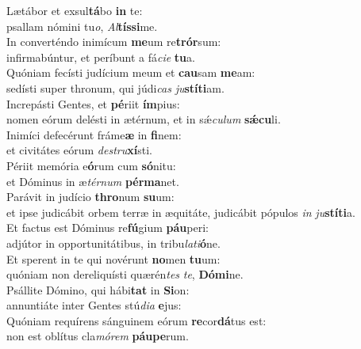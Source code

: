 \evenverse Lætábor et exsul\textbf{tá}bo \textbf{in} te:~\*\\
\evenverse psallam nómini tu\textit{o}, \textit{Al}\textbf{tís}\textbf{si}me.\\
\oddverse In converténdo inimícum \textbf{me}um re\textbf{trór}sum:~\*\\
\oddverse infirmabúntur, et períbunt a fá\textit{ci}\textit{e} \textbf{tu}a.\\
\evenverse Quóniam fecísti judícium meum et \textbf{cau}sam \textbf{me}am:~\*\\
\evenverse sedísti super thronum, qui júdi\textit{cas} \textit{ju}\textbf{stí}\textbf{ti}am.\\
\oddverse Increpásti Gentes, et \textbf{pé}riit \textbf{ím}pius:~\*\\
\oddverse nomen eórum delésti in ætérnum, et in sǽ\textit{cu}\textit{lum} \textbf{sǽ}\textbf{cu}li.\\
\evenverse Inimíci defecérunt fráme\textbf{æ} in \textbf{fi}nem:~\*\\
\evenverse et civitátes eórum \textit{de}\textit{stru}\textbf{xí}sti.\\
\oddverse Périit memória e\textbf{ó}rum cum \textbf{só}nitu:~\*\\
\oddverse et Dóminus in æ\textit{tér}\textit{num} \textbf{pér}\textbf{ma}net.\\
\evenverse Parávit in judício \textbf{thro}num \textbf{su}um:~\*\\
\evenverse et ipse judicábit orbem terræ in æquitáte, judicábit pópulos \textit{in} \textit{ju}\textbf{stí}\textbf{ti}a.\\
\oddverse Et factus est Dóminus re\textbf{fú}gium \textbf{páu}peri:~\*\\
\oddverse adjútor in opportunitátibus, in tribu\textit{la}\textit{ti}\textbf{ó}ne.\\
\evenverse Et sperent in te qui novérunt \textbf{no}men \textbf{tu}um:~\*\\
\evenverse quóniam non dereliquísti quærén\textit{tes} \textit{te}, \textbf{Dó}\textbf{mi}ne.\\
\oddverse Psállite Dómino, qui hábi\textbf{tat} in \textbf{Si}on:~\*\\
\oddverse annuntiáte inter Gentes stú\textit{di}\textit{a} \textbf{e}jus:\\
\evenverse Quóniam requírens sánguinem eórum \textbf{re}cor\textbf{dá}tus est:~\*\\
\evenverse non est oblítus cla\textit{mó}\textit{rem} \textbf{páu}\textbf{pe}rum.\\
